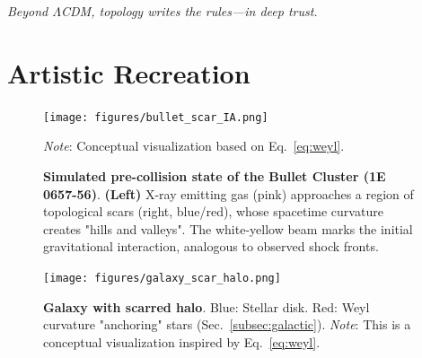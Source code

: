 \documentclass{article}
\begin{document}
\begin{flushright}
\textit{Beyond $\Lambda$CDM, topology writes the rules—in deep trust.}
\end{flushright}

\section{Artistic Recreation}
\label{sec:art}
\begin{figure}[H]  
  \centering  
  \texttt{[image: figures/bullet\_scar\_IA.png]}  
  \caption{
    \textbf{Simulated pre-collision state of the Bullet Cluster (1E 0657-56)}. 
    \textbf{(Left)} X-ray emitting gas (pink) approaches a region of topological scars (right, blue/red), 
    whose spacetime curvature creates "hills and valleys". The white-yellow beam marks the initial 
    gravitational interaction, analogous to observed shock fronts.}
    \textit{Note}: Conceptual visualization based on Eq.~\ref{eq:weyl}.
  \label{fig:bullet_scar}  
\end{figure}  
\FloatBarrier
\begin{figure}[H]  
  \centering  
  \texttt{[image: figures/galaxy\_scar\_halo.png]}  
  \caption{  
    \textbf{Galaxy with scarred halo}. Blue: Stellar disk. Red: Weyl curvature "anchoring" stars (Sec.~\ref{subsec:galactic}).  
    \textit{Note}: This is a conceptual visualization inspired by Eq.~\ref{eq:weyl}.  }
  \label{fig:scar_halo_art}  
\end{figure}  
\end{document}
